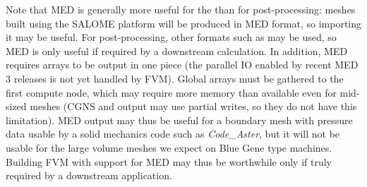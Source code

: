 \documentclass[a4paper,10pt,twoside]{article}
\begin{document}

Note that MED is generally more useful for the \pcs than for post-processing:
meshes built using the SALOME platform will be produced in MED format, so
importing it may be useful. For post-processing, other formats such
as \ensight may be used, so
MED is only useful if required by a downstream calculation.
In addition, MED requires arrays to be output in one piece
(the parallel IO enabled by recent MED 3 releases is not yet
handled by FVM). Global arrays must be gathered to the first compute node,
which may require more memory than available even for mid-sized meshes
(CGNS and \ensight output may use partial writes, so they do not have this
limitation). MED output may thus be useful for a boundary mesh
with pressure data usable by a solid mechanics code such as
\emph{Code\_Aster}, but it will not be usable for the
large volume meshes we expect on Blue Gene type machines.
Building FVM with support for MED may thus be worthwhile
only if truly required by a downstream application.
\end{document}
